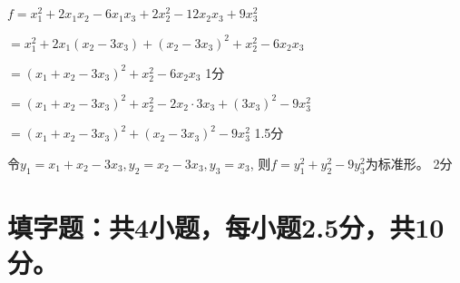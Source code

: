 \documentclass[answer=true,countunit=section,sheetsize=A3,paperprint=double,scoretable]{simplexam}
\begin{document}
{\begin{solution}{4.5}
$f = x_1^2 + 2 x_1 x_2 - 6 x_1 x_3 + 2 x_2^2 - 12 x_2 x_3 + 9 x^2_3$ \par
\qquad\qquad$= x_1^2 + 2 x_1 (x_2 - 3 x_3) + (x_2 - 3 x_3)^2 + x_2^2 - 6 x_2 x_3 $ \par
\qquad\qquad$= (x_1 + x_2 - 3 x_3)^2 + x_2^2 - 6 x_2 x_3$ \dotfill 1分 \par
\qquad\qquad$= (x_1 + x_2 - 3 x_3)^2 + x_2^2 - 2 x_2 \cdot 3 x_3 + (3 x_3)^2 - 9x_3^2$ \par
\qquad\qquad$= (x_1 + x_2 - 3 x_3)^2 + (x_2 - 3 x_3)^2 - 9 x_3^2$ \dotfill 1.5分\par
令$y_1 = x_1 + x_2 - 3 x_3, y_2 = x_2 - 3 x_3, y_3 = x_3$, \newline
则$f = y_1^2 + y_2^2 - 9y_3^2$为标准形。 \dotfill 2分
\end{solution}


}

\section{填字题：共4小题，每小题2.5分，共10分。}
\end{document}
